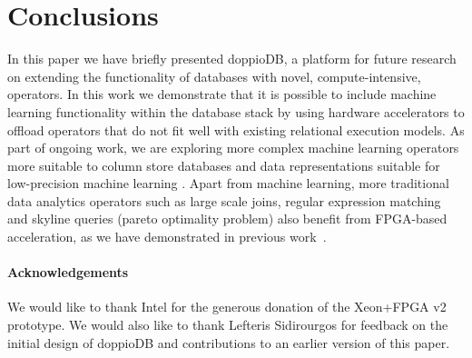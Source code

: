 \documentclass[11pt,dvipdfm]{article}
\begin{document}
\section{Conclusions}
In this paper we have briefly presented doppioDB, a platform for future research on extending the functionality of databases with novel, compute-intensive, operators. In this work we demonstrate that it is possible to include machine learning functionality within the database stack by using hardware accelerators to offload operators that do not fit well with existing relational execution models. As part of ongoing work, we are exploring more complex machine learning operators more suitable to column store databases \cite{KaanVLDB19} and data representations suitable for low-precision machine learning \cite{zekevldb19}. Apart from machine learning, more traditional data analytics operators such as large scale joins, regular expression matching and skyline queries (pareto optimality problem) also benefit from FPGA-based acceleration, as we have demonstrated in previous work~\cite{demosigmod2017}. %


\paragraph{Acknowledgements} We would like to thank Intel for the generous donation of the Xeon+FPGA v2 prototype. We would also like to thank Lefteris Sidirourgos for feedback on the initial design of doppioDB and contributions to an earlier version of this paper.



%
% 
\end{document}
